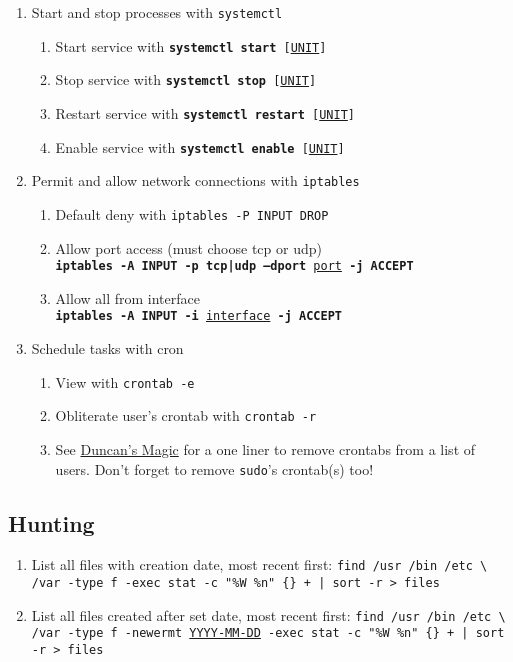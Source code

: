 \documentclass[12pt,letterpaper]{article}
\def\code#1{\textcolor{iris}{\texttt{#1}}}
\def\bf#1{\textbf{#1}}
\def\ul#1{\underline{#1}}
\begin{document}
\begin{enumerate}
	\item Start and stop processes with \code{systemctl}
	\begin{enumerate}
		\item Start service with \code{\bf{systemctl start} [\ul{UNIT}]}
		\item Stop service with \code{\bf{systemctl stop} [\ul{UNIT}]}
		\item Restart service with \code{\bf{systemctl restart} [\ul{UNIT}]}
		\item Enable service with \code{\bf{systemctl enable} [\ul{UNIT}]}
	\end{enumerate}
	\item Permit and allow network connections with \code{iptables}
	\begin{enumerate}
		\item Default deny with \code{iptables -P INPUT DROP}
		\item Allow port access (must choose tcp or udp) \\
			\code{\bf{iptables -A INPUT -p tcp|udp --dport} \ul{port} \bf{-j ACCEPT}}
		\item Allow all from interface \\
			\code{\bf{iptables -A INPUT -i} \ul{interface} \bf{-j ACCEPT}}
	\end{enumerate}
	\item Schedule tasks with cron
	\begin{enumerate}
		\item View with \code{crontab -e}
		\item Obliterate user's crontab with \code{crontab -r}
		\item See \hyperref[subsec:dmagic]{Duncan's Magic} for a one liner to remove crontabs from a list of users. Don't forget to remove \code{sudo}'s crontab(s) too!
	\end{enumerate}
\end{enumerate}

\subsection{Hunting}

\begin{enumerate}
	\item List all files with creation date, most recent first: \code{find /usr /bin /etc \textbackslash \\
		/var -type f -exec stat -c "\%W \%n" \{\} + | sort -r > files}
	\item List all files created after set date, most recent first: \code{find /usr /bin /etc \textbackslash \\
		/var -type f -newermt \ul{YYYY-MM-DD} -exec stat -c "\%W \%n" \{\} + | sort -r > files}
\end{enumerate}
\end{document}
